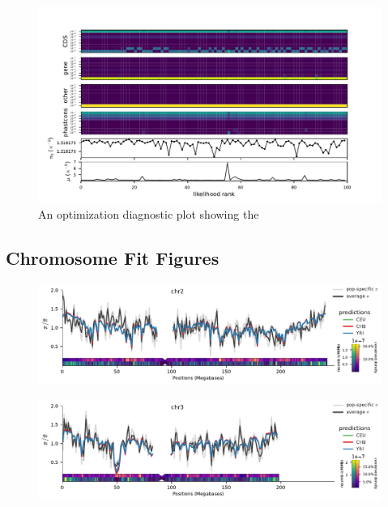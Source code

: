 \documentclass[11pt]{article}
\begin{document}
\begin{figure}[!htb]
  \label{suppfig:diag-plot}
  \centering
  \includegraphics[width=\textwidth]{figures/supplementary/figure_feature_priority_yri_full_diag.pdf}
  \caption{
      An optimization diagnostic plot showing the }
\end{figure}




\subsection{Chromosome Fit Figures}
\clearpage

\begin{figure}[!htb]
  \centering
  \includegraphics[width=\textwidth]{figures/supplementary/pred_plot_chr2.pdf}
  \label{suppfig:fit-chr1}
\end{figure}


\begin{figure}[!htb]
  \centering
  \includegraphics[width=\textwidth]{figures/supplementary/pred_plot_chr3.pdf}
  \label{suppfig:fit-chr3}
\end{figure}
\end{document}
